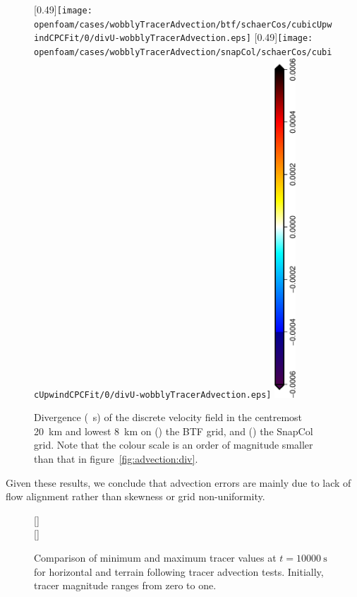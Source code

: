 \begin{figure}
	\captionsetup[subfigure]{position=b}
	\centering
%
	[0.49\textwidth]{\texttt{[image: openfoam/cases/wobblyTracerAdvection/btf/schaerCos/cubicUpwindCPCFit/0/divU-wobblyTracerAdvection.eps]}}
	\hfill
	[0.49\textwidth]{\texttt{[image: openfoam/cases/wobblyTracerAdvection/snapCol/schaerCos/cubicUpwindCPCFit/0/divU-wobblyTracerAdvection.eps]}}
%
	\includegraphics[height=5in,angle=270]{legends/divU-wobblyTracerAdvection_divU.eps}
%
	\caption{Divergence (\si{\per\second}) of the discrete velocity field in the centremost \SI{20}{\kilo\meter} and lowest \SI{8}{\kilo\meter} on () the BTF grid, and () the SnapCol grid.  Note that the colour scale is an order of magnitude smaller than that in figure~\ref{fig:advection:div}.}
	\label{fig:wobblyTracerAdvection:div}
\end{figure}


Given these results, we conclude that advection errors are mainly due to lack of flow alignment rather than skewness or grid non-uniformity.

\begin{figure}
	\captionsetup[subfigure]{position=b}
	\centering
	[\textwidth]{} \\
	[\textwidth]{}
%
	\caption{Comparison of minimum and maximum tracer values at $t = \SI{10000}{\second}$ for horizontal and terrain following tracer advection tests.  Initially, tracer magnitude ranges from zero to one.}
	\label{fig:wobblyTracerAdvection:ranges}
\end{figure}

